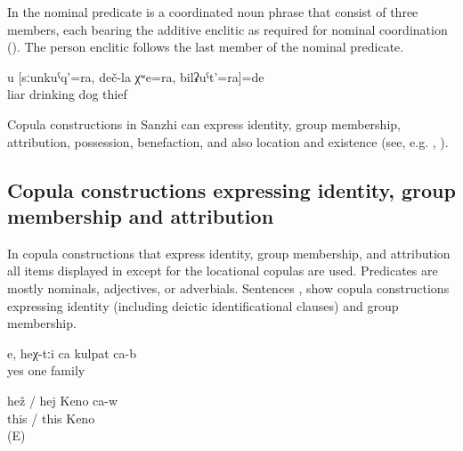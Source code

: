 In  the nominal predicate is a coordinated noun phrase that consist of three members, each bearing the additive enclitic as required for nominal coordination (). The person enclitic follows the last member of the nominal predicate.
%
\begin{exe}
	\ex	\label{ex:You are a liar, a drinking dog, and a thief}
	\gll	u	[sːunkuˁq'=ra,	deč-la	χʷe=ra,	bilʡuˁt'=ra]=de\\
			liar	drinking	dog	thief\\
	\glt	{}
\end{exe}

Copula constructions in Sanzhi can express identity, group membership, attribution, possession, benefaction, and also location and existence (see, e.g. \citealp{Curnow2000}, \citealp[159]{Dixon2010}). 

\subsection{Copula constructions expressing identity, group membership and attribution}
\label{ssec:Copula constructions expressing identity, group membership and attribution}

In copula constructions that express identity, group membership, and attribution all items displayed in  except for the locational copulas are used. Predicates are mostly nominals, adjectives, or adverbials. Sentences ,  show copula constructions expressing identity (including deictic identificational clauses) and group membership. 
%
\begin{exe}
	\ex	\label{ex:Yes, they are one family}
	\gll	e,	heχ-tːi	ca	kulpat	ca-b\\
		yes		one	family		\\
	\glt	{}

	\ex	\label{ex:This is Zapir}
	\gll	hež	/	hej	Keno	ca-w\\
		this	/	this	Keno	\\
	\glt	{} (E)
\end{exe}

